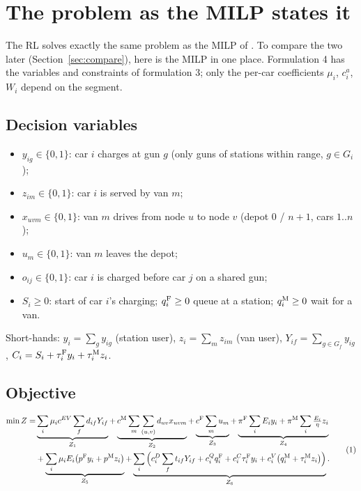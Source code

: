 \section{The problem as the MILP states it}
\label{sec:milp}

The RL solves exactly the same problem as the MILP of . To compare the two later (Section~\ref{sec:compare}), here is the MILP in one place. Formulation 4 has the variables and constraints of formulation 3; only the per-car coefficients $\mu_i$, $c^a_i$, $W_i$ depend on the segment.

\subsection{Decision variables}
\begin{itemize}
  \item $y_{ig}\in\{0,1\}$: car $i$ charges at gun $g$ (only guns of stations within range, $g\in G_i$);
  \item $z_{im}\in\{0,1\}$: car $i$ is served by van $m$;
  \item $x_{uvm}\in\{0,1\}$: van $m$ drives from node $u$ to node $v$ (depot $0$ / $n+1$, cars $1..n$);
  \item $u_m\in\{0,1\}$: van $m$ leaves the depot;
  \item $o_{ij}\in\{0,1\}$: car $i$ is charged before car $j$ on a shared gun;
  \item $S_i\ge0$: start of car $i$'s charging; $q^{\mathrm{F}}_i\ge0$ queue at a station; $q^{\mathrm{M}}_i\ge0$ wait for a van.
\end{itemize}
Short-hands: $y_i=\sum_g y_{ig}$ (station user), $z_i=\sum_m z_{im}$ (van user), $Y_{if}=\sum_{g\in G_f}y_{ig}$, $C_i=S_i+\tau^{\mathrm{F}}_i y_i+\tau^{\mathrm{M}}_i z_i$.

\subsection{Objective}
\begin{equation}
\begin{aligned}
\min Z=&\underbrace{\sum_i\mu_i c^{EV}\sum_f d_{if}Y_{if}}_{Z_1}
+\underbrace{c^{\mathrm{M}}\sum_m\sum_{(u,v)}d_{uv}x_{uvm}}_{Z_2}
+\underbrace{c^{\mathrm{F}}\sum_m u_m}_{Z_3}
+\underbrace{\pi^{\mathrm{F}}\sum_i E_iy_i+\pi^{\mathrm{M}}\sum_i\tfrac{E_i}{\eta}z_i}_{Z_4}\\
&+\underbrace{\sum_i\mu_iE_i\big(p^{\mathrm{F}} y_i+p^{\mathrm{M}} z_i\big)}_{Z_5}
+\underbrace{\sum_i\Big(c^D_i\sum_f t_{if}Y_{if}+c^Q_iq^{\mathrm{F}}_i+c^C_i\tau^{\mathrm{F}}_iy_i+c^V_i\big(q^{\mathrm{M}}_i+\tau^{\mathrm{M}}_iz_i\big)\Big)}_{Z_6}.
\end{aligned}\tag{1}
\end{equation}

